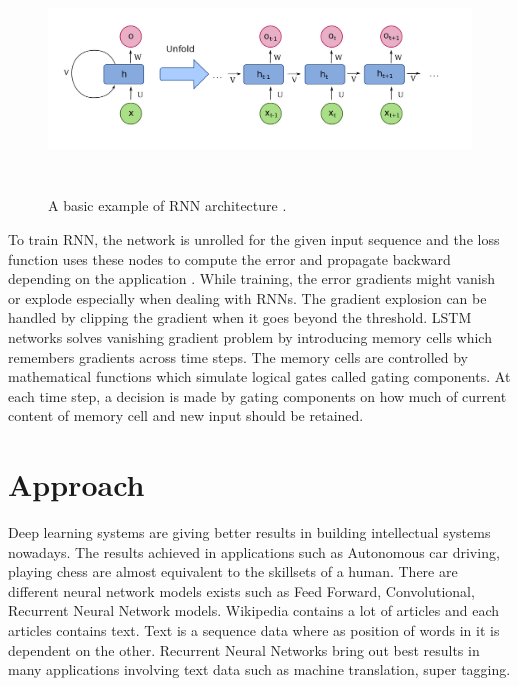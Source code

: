 \documentclass[a4paper, 11pt]{article}
\begin{document}

\begin{figure}[htpb]
    \centering
    \includegraphics[width=\textwidth,height=6cm,keepaspectratio=true]
    {Recurrent_neural_network_unfold.png}
    \caption{
        A basic example of RNN architecture \cite{WikipediaEN_RNN_unfold}.
    }
    \label{fig:A basic RNN architecture}
\end{figure}

To train RNN, the network is unrolled for the given input sequence and the loss function uses these nodes to compute the error and propagate backward depending on the application \cite{Werbos1990}. While training, the error gradients might vanish or explode especially when dealing with RNNs. The gradient explosion can be handled by clipping the gradient when it goes beyond the threshold. LSTM networks \cite{Hochreiter1997} solves vanishing gradient problem by introducing memory cells which remembers gradients across time steps. The memory cells are controlled by mathematical functions which simulate logical gates called gating components. At each time step, a decision is made by gating components on how much of current content of memory cell and new input should be retained. 


\section{Approach}

Deep learning systems are giving better results in building intellectual systems nowadays.\cite{Goldberg2016} The results achieved in applications such as Autonomous car driving, playing chess are almost equivalent to the skillsets of a human. There are different neural network models exists such as Feed Forward, Convolutional, Recurrent Neural Network models. Wikipedia contains a lot of articles and each articles contains text. Text is a sequence data where as position of words in it is dependent on the other. Recurrent Neural Networks bring out best results in many applications involving text data such as machine translation, super tagging.
\end{document}
